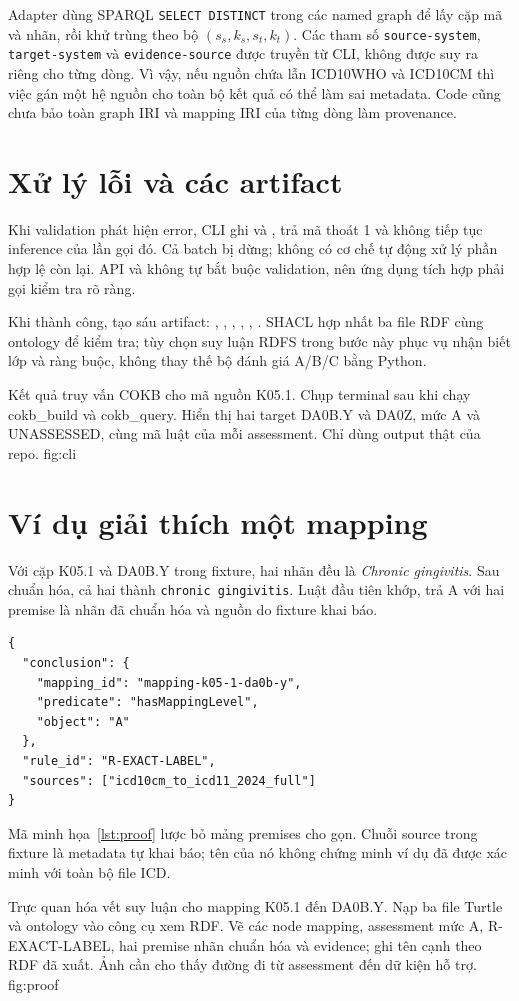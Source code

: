 Adapter dùng SPARQL \texttt{SELECT DISTINCT} trong các named graph để lấy
cặp mã và nhãn, rồi khử trùng theo bộ $(s_s,k_s,s_t,k_t)$.
Các tham số \texttt{source-system}, \texttt{target-system} và
\texttt{evidence-source} được truyền từ CLI, không được suy ra riêng cho
từng dòng. Vì vậy, nếu nguồn chứa lẫn ICD10WHO và ICD10CM thì việc gán
một hệ nguồn cho toàn bộ kết quả có thể làm sai metadata.
Code cũng chưa bảo toàn graph IRI và mapping IRI của từng dòng làm provenance.

\section{Xử lý lỗi và các artifact}
Khi validation phát hiện error, CLI ghi
 và , trả mã thoát 1 và
không tiếp tục inference của lần gọi đó. Cả batch bị dừng; không có cơ chế
tự động xử lý phần hợp lệ còn lại. API  và 
không tự bắt buộc validation, nên ứng dụng tích hợp phải gọi kiểm tra rõ ràng.

Khi thành công,  tạo sáu artifact:
, , ,
, , .
SHACL hợp nhất ba file RDF cùng ontology để kiểm tra; tùy chọn suy luận
RDFS trong bước này phục vụ nhận biết lớp và ràng buộc,
không thay thế bộ đánh giá A/B/C bằng Python.

{Kết quả truy vấn COKB cho mã nguồn K05.1.}
{Chụp terminal sau khi chạy cokb\_build và cokb\_query.
Hiển thị hai target DA0B.Y và DA0Z, mức A và UNASSESSED,
cùng mã luật của mỗi assessment. Chỉ dùng output thật của repo.}
{fig:cli}

\section{Ví dụ giải thích một mapping}
Với cặp K05.1 và DA0B.Y trong fixture, hai nhãn đều là
\emph{Chronic gingivitis}. Sau chuẩn hóa, cả hai thành
\texttt{chronic gingivitis}. Luật đầu tiên khớp, trả A với hai premise
là nhãn đã chuẩn hóa và nguồn do fixture khai báo.
\begin{lstlisting}[caption={Trích phần proof của ví dụ nhãn trùng nhau},label={lst:proof}]
{
  "conclusion": {
    "mapping_id": "mapping-k05-1-da0b-y",
    "predicate": "hasMappingLevel",
    "object": "A"
  },
  "rule_id": "R-EXACT-LABEL",
  "sources": ["icd10cm_to_icd11_2024_full"]
}
\end{lstlisting}
Mã minh họa~\ref{lst:proof} lược bỏ mảng premises cho gọn.
Chuỗi source trong fixture là metadata tự khai báo; tên của nó không
chứng minh ví dụ đã được xác minh với toàn bộ file ICD.

{Trực quan hóa vết suy luận cho mapping K05.1 đến DA0B.Y.}
{Nạp ba file Turtle và ontology vào công cụ xem RDF.
Vẽ các node mapping, assessment mức A, R-EXACT-LABEL,
hai premise nhãn chuẩn hóa và evidence; ghi tên cạnh theo RDF đã xuất.
Ảnh cần cho thấy đường đi từ assessment đến dữ kiện hỗ trợ.}
{fig:proof}

